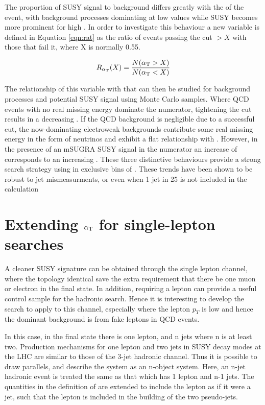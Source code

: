 The proportion of SUSY signal to background differs greatly with the \HT of the event, with background processes dominating at low values while SUSY becomes more prominent for high \HT. In order to investigate this behaviour a new variable \RaT is defined in Equation \ref{eqn:rat} as the ratio of events passing the cut \alt $> X$ with those that fail it, where X is normally 0.55. 

\begin{equation}
R_{\alpha_{\text{T}}}(X) = \frac{N(\alpha_{\text{T}} > X)}{N(\alpha_{\text{T}} < X)}
\label{eqn:rat}
\end{equation}

The relationship of this variable with \HT that can then be studied for background processes and potential SUSY signal using Monte Carlo samples. Where QCD events with no real missing energy dominate the numerator, tightening the \HT cut results in a decreasing \RaT. If the QCD background is negligible due to a successful \alt cut, the now-dominating  electroweak backgrounds contribute some real missing energy in the form of neutrinos and exhibit a flat relationship with \HT. However, in the presence of an mSUGRA SUSY signal in the numerator an increase of \HT corresponds to an increasing \RaT. These three distinctive behaviours provide a strong search strategy using \RaT in exclusive bins of \HT. These trends have been shown to be robust to jet mismeasurments, or even when 1 jet in 25 is not included in the calculation \cite{an2010_119}



\section{Extending $\alpha_{\text{T}}$ for single-lepton searches}

A cleaner SUSY signature can be obtained through the single lepton channel, where the topology identical save the extra requirement that there be one muon or electron in the final state. In addition, requiring a lepton can provide a useful control sample for the hadronic search. Hence it is interesting to develop the \alt search to apply to this channel, especially where the lepton $p_{T}$ is low and hence the dominant background is from fake leptons in QCD events. 

In this case, in the final state there is one lepton, and n jets where n is at least two. Production mechanisms for one lepton and two jets in SUSY decay modes at the LHC are similar to those of the 3-jet hadronic channel. Thus it is possible to draw parallels, and describe the system as an n-object system. Here, an n-jet hadronic event is treated the same as that which has 1 lepton and n-1 jets.  The quantities in the definition of \alt are extended to include the lepton as if it were a jet, such that the lepton is included in the building of the two pseudo-jets. 

